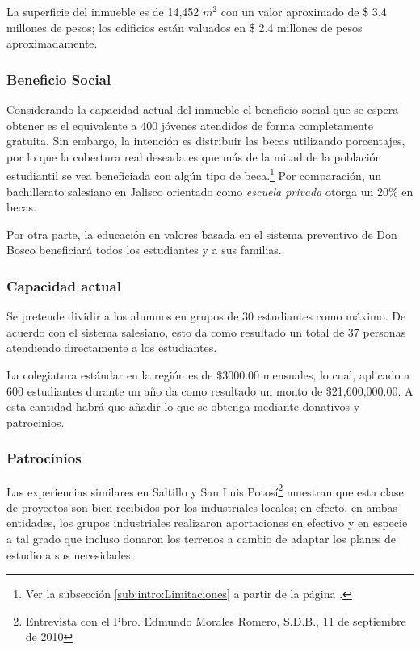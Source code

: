 La superficie del inmueble es de 14,452 $m^2$ con un valor aproximado de \$ 3.4 millones de pesos; los edificios están valuados en \$ 2.4 millones de pesos aproximadamente.


\subsubsection{Beneficio Social}
\label{sub:sub:Beneficio:Social}

Considerando la capacidad actual del inmueble el beneficio social que se espera obtener es el equivalente a 400 jóvenes atendidos de forma completamente gratuita. Sin embargo, la intención es distribuir las becas utilizando porcentajes, por lo que la cobertura real deseada es que más de la mitad de la población estudiantil se vea beneficiada con algún tipo de beca.\footnote{Ver la subsección \ref{sub:intro:Limitaciones} a partir de la página \pageref{sub:intro:Limitaciones}.} Por comparación, un bachillerato salesiano en Jalisco orientado como \emph{escuela privada} otorga un 20\% en becas.

Por otra parte, la educación en valores basada en el sistema preventivo de Don Bosco beneficiará todos los estudiantes y a sus familias.

\subsubsection{Capacidad actual}

Se pretende dividir a los alumnos en grupos de 30 estudiantes como máximo. De acuerdo con el sistema salesiano, esto da como resultado un total de 37 personas atendiendo directamente a los estudiantes.

La colegiatura estándar en la región es de \$3000.00 mensuales, lo cual, aplicado a 600 estudiantes durante un año da como resultado un monto de \$21,600,000.00. A esta cantidad habrá que añadir lo que se obtenga mediante donativos y patrocinios.

\subsubsection{Patrocinios}
\label{sub:Patrocinios}

Las experiencias similares en Saltillo y San Luis Potosí\footnote{Entrevista con el Pbro. Edmundo Morales Romero, S.D.B., 11 de septiembre de 2010} muestran que esta clase de proyectos son bien recibidos por los industriales locales; en efecto, en ambas entidades, los grupos industriales realizaron aportaciones en efectivo y en especie a tal grado que incluso donaron los terrenos a cambio de adaptar los planes de estudio a sus necesidades.

